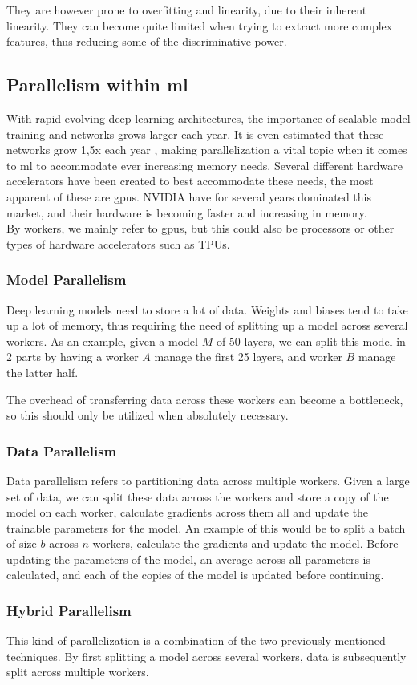 They are however prone to overfitting and linearity, due to their inherent linearity. They can become quite limited when trying to extract more complex features, thus reducing some of the discriminative power.

\subsection{Parallelism within \acrlong{ml}}

With rapid evolving deep learning architectures, the importance of scalable model training and networks grows larger each year. It is even estimated that these networks grow 1,5x each year \cite{9499913}, making parallelization a vital topic when it comes to \acrlong{ml} to accommodate ever increasing memory needs. Several different hardware accelerators have been created to best accommodate these needs, the most apparent of these are \acrshort{gpu}s. NVIDIA have for several years dominated this market, and their hardware is becoming faster and increasing in memory. \\

By workers, we mainly refer to \acrshort{gpu}s, but this could also be processors or other types of hardware accelerators such as TPUs.


\subsubsection{Model Parallelism}

Deep learning models need to store a lot of data. Weights and biases tend to take up a lot of memory, thus requiring the need of splitting up a model across several workers. As an example, given a model $M$ of 50 layers, we can split this model in 2 parts by having a worker $A$ manage the first 25 layers, and worker $B$ manage the latter half.

The overhead of transferring data across these workers can become a bottleneck, so this should only be utilized when absolutely necessary.

\subsubsection{Data Parallelism}

Data parallelism refers to partitioning data across multiple workers.  Given a large set of data, we can split these data across the workers and store a copy of the model on each worker, calculate gradients across them all and update the trainable parameters for the model. An example of this would be to split a batch of size $b$ across $n$ workers, calculate the gradients and update the model. Before updating the parameters of the model, an average across all parameters is calculated, and each of the copies of the model is updated before continuing.

\subsubsection{Hybrid Parallelism}

This kind of parallelization is a combination of the two previously mentioned techniques. By first splitting a model across several workers, data is subsequently split across multiple workers. 